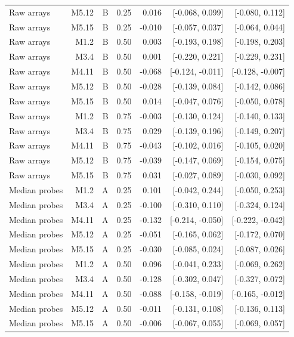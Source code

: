 \begin{longtable}{lrrrrrr}
Raw arrays & M5.12 & B & 0.25 & 0.016 & [-0.068, 0.099] & [-0.080, 0.112] \\
Raw arrays & M5.15 & B & 0.25 & -0.010 & [-0.057, 0.037] & [-0.064, 0.044] \\
Raw arrays & M1.2 & B & 0.50 & 0.003 & [-0.193, 0.198] & [-0.198, 0.203] \\
Raw arrays & M3.4 & B & 0.50 & 0.001 & [-0.220, 0.221] & [-0.229, 0.231] \\
Raw arrays & M4.11 & B & 0.50 & -0.068 & [-0.124, -0.011] & [-0.128, -0.007] \\
Raw arrays & M5.12 & B & 0.50 & -0.028 & [-0.139, 0.084] & [-0.142, 0.086] \\
Raw arrays & M5.15 & B & 0.50 & 0.014 & [-0.047, 0.076] & [-0.050, 0.078] \\
Raw arrays & M1.2 & B & 0.75 & -0.003 & [-0.130, 0.124] & [-0.140, 0.133] \\
Raw arrays & M3.4 & B & 0.75 & 0.029 & [-0.139, 0.196] & [-0.149, 0.207] \\
Raw arrays & M4.11 & B & 0.75 & -0.043 & [-0.102, 0.016] & [-0.105, 0.020] \\
Raw arrays & M5.12 & B & 0.75 & -0.039 & [-0.147, 0.069] & [-0.154, 0.075] \\
Raw arrays & M5.15 & B & 0.75 & 0.031 & [-0.027, 0.089] & [-0.030, 0.092] \\
Median probes & M1.2 & A & 0.25 & 0.101 & [-0.042, 0.244] & [-0.050, 0.253] \\
Median probes & M3.4 & A & 0.25 & -0.100 & [-0.310, 0.110] & [-0.324, 0.124] \\
Median probes & M4.11 & A & 0.25 & -0.132 & [-0.214, -0.050] & [-0.222, -0.042] \\
Median probes & M5.12 & A & 0.25 & -0.051 & [-0.165, 0.062] & [-0.172, 0.070] \\
Median probes & M5.15 & A & 0.25 & -0.030 & [-0.085, 0.024] & [-0.087, 0.026] \\
Median probes & M1.2 & A & 0.50 & 0.096 & [-0.041, 0.233] & [-0.069, 0.262] \\
Median probes & M3.4 & A & 0.50 & -0.128 & [-0.302, 0.047] & [-0.327, 0.072] \\
Median probes & M4.11 & A & 0.50 & -0.088 & [-0.158, -0.019] & [-0.165, -0.012] \\
Median probes & M5.12 & A & 0.50 & -0.011 & [-0.131, 0.108] & [-0.136, 0.113] \\
Median probes & M5.15 & A & 0.50 & -0.006 & [-0.067, 0.055] & [-0.069, 0.057] \\

\end{longtable}
